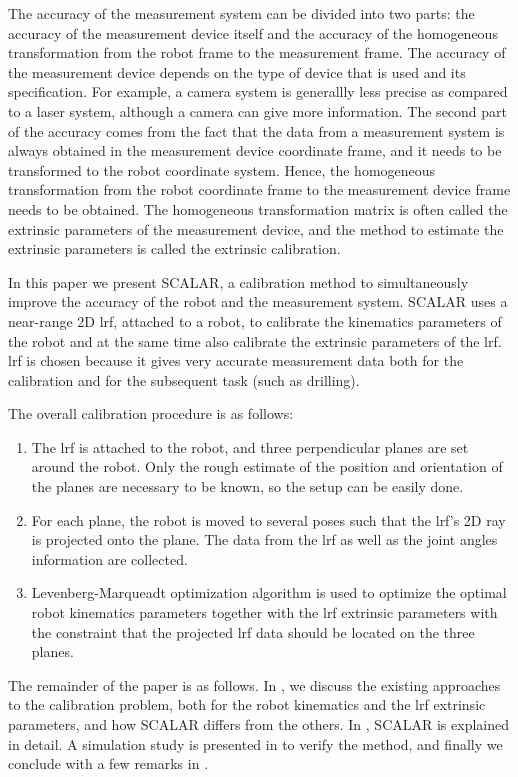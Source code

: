 The accuracy of the measurement system can be divided into two parts: the accuracy of the measurement device itself and the accuracy of the homogeneous transformation from the robot frame to the measurement frame. The accuracy of the measurement device depends on the type of device that is used and its specification. For example, a camera system is generallly less precise as compared to a laser system, although a camera can give more information. The second part of the accuracy comes from the fact that the data from a measurement system is always obtained in the measurement device coordinate frame, and it needs to be transformed to the robot coordinate system. Hence, the homogeneous transformation from the robot coordinate frame to the measurement device frame needs to be obtained. The homogeneous transformation matrix is often called the extrinsic parameters of the measurement device, and the method to estimate the extrinsic parameters is called the extrinsic calibration.  

In this paper we present SCALAR, a calibration method to simultaneously improve the accuracy of the robot and the measurement system. SCALAR uses a near-range 2D \ac{lrf}, attached to a robot, to calibrate the kinematics parameters of the robot and at the same time also calibrate the extrinsic parameters of the \ac{lrf}. \ac{lrf} is chosen because it gives very accurate measurement data both for the calibration and for the subsequent task (such as drilling).  

The overall calibration procedure is as follows:
\begin{enumerate}
\item The \ac{lrf} is attached to the robot, and three perpendicular planes are set around the robot. Only the rough estimate of the position and orientation of the planes are necessary to be known, so the setup can be easily done.
\item For each plane, the robot is moved to several poses such that the \ac{lrf}'s 2D ray is projected onto the plane. The data from the \ac{lrf} as well as the joint angles information are collected.
\item Levenberg-Marqueadt optimization algorithm is used to optimize the optimal robot kinematics parameters together with the \ac{lrf} extrinsic parameters with the constraint that the projected \ac{lrf} data should be located on the three planes. 
\end{enumerate}

The remainder of the paper is as follows. In , we discuss the existing approaches to the calibration problem, both for the robot kinematics and the \ac{lrf} extrinsic parameters, and how SCALAR differs from the others. In , SCALAR is explained in detail. A simulation study is presented in  to verify the method, and finally we conclude with a few remarks in .  



